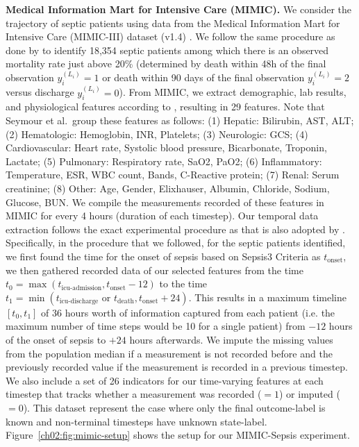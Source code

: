\textbf{Medical Information Mart for Intensive Care (MIMIC).}
We consider the trajectory of septic patients using data from the Medical Information Mart
for Intensive Care (MIMIC-III) dataset (v1.4) \citep{johnson2018mimic}.
We follow the same procedure as done by \citet{komorowski2018artificial} to identify 18,354 septic patients among which there is an observed mortality rate just above 20\% (determined by death within 48h of the final observation $y_i^{(L_i)}=1$ or death within 90 days of the final observation $y_i^{(L_i)}=2$ versus discharge $y_i^{(L_i)}=0$).
From MIMIC, we extract demographic, lab results, and physiological features according to \citet{seymour2019derivation}, resulting in 29 features.
Note that Seymour et al.~group these features as follows: (1) Hepatic: Bilirubin, AST, ALT; (2) Hematologic: Hemoglobin, INR, Platelets; (3) Neurologic: GCS; (4) Cardiovascular: Heart rate, Systolic blood pressure, Bicarbonate, Troponin, Lactate; (5) Pulmonary: Respiratory rate, SaO2, PaO2; (6) Inflammatory: Temperature, ESR, WBC count, Bands, C-Reactive protein; (7) Renal: Serum creatinine; (8) Other: Age, Gender, Elixhauser, Albumin, Chloride, Sodium, Glucose, BUN. 
We compile the measurements recorded of these features in MIMIC for every 4 hours (duration of each timestep). 
Our temporal data extraction follows the exact experimental procedure as \citet{komorowski2018artificial} that is also adopted by \citet{killian2020empirical}.
Specifically, in the procedure that we followed, for the septic patients identified, we first found the time for the onset of sepsis based on Sepsis3 Criteria as $t_{\text{onset}}$, we then gathered recorded data of our selected features from the time 
$t_0 = \max(t_{\text{icu-admission}}, t_{\text{onset}}-12)$ to the time $t_1 = \min(t_{\text{icu-discharge}} \text{ or } t_{\text{death}}, t_{\text{onset}}+24)$.
This results in a maximum timeline $[t_0, t_1]$ of 36 hours worth of information captured from each patient (i.e. the maximum number of time steps would be 10 for a single patient) from $-12$ hours of the onset of sepsis to $+24$ hours afterwards.
We impute the missing values from the population median if a measurement is not recorded before and the previously recorded value if the measurement is recorded in a previous timestep. 
We also include a set of 26 indicators for our time-varying features at each timestep that tracks whether a measurement was recorded ($=1$) or imputed ($=0$).
This dataset represent the case where only the final outcome-label is known and non-terminal timesteps have unknown state-label.
Figure~\ref{ch02:fig:mimic-setup} shows the setup for our MIMIC-Sepsis experiment.


